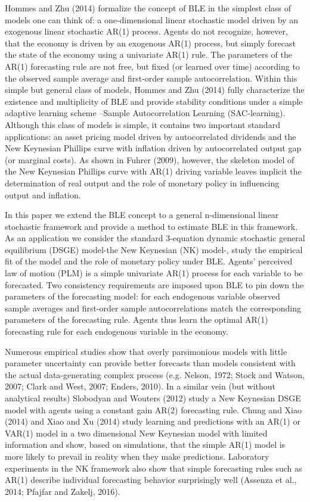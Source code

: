 Hommes and Zhu (2014) formalize the concept of BLE in the simplest class of models one can think of: a one-dimensional linear stochastic model driven by an exogenous linear stochastic AR(1) process. Agents do not recognize, however, that the economy is driven by an exogenous AR(1) process, but simply forecast the state of the economy using a
univariate AR(1) rule. The parameters of the AR(1) forecasting rule are not free, but fixed (or learned over time) according to the observed sample average and first-order sample autocorrelation. Within this simple but general class of models, Hommes and Zhu (2014) fully characterize the existence and multiplicity of BLE and provide stability conditions under a simple adaptive learning scheme --Sample Autocorrelation Learning (SAC-learning). Although this class of models is simple, it contains two important standard applications: an asset pricing model driven by autocorrelated dividends and the New Keynesian Phillips curve with inflation driven by autocorrelated output gap (or marginal costs). As shown in Fuhrer (2009), however, the skeleton model of the New Keynesian Phillips curve with AR(1) driving variable leaves implicit the determination of real output and the role of monetary policy in influencing output and inflation.

In this paper we extend the BLE concept to a general n-dimensional linear stochastic framework and provide a method to estimate BLE in this framework. As an application we consider the standard 3-equation dynamic stochastic general equilibrium (DSGE) model-the New Keynesian (NK) model-, study the empirical fit of the model and the role of monetary policy under BLE. Agents' perceived law of motion (PLM) is a simple univariate AR(1) process for each variable to be forecasted. Two consistency requirements are imposed upon BLE to pin down the parameters of the forecasting model: for each endogenous variable observed sample averages and first-order sample autocorrelations match the corresponding parameters of the forecasting rule. Agents thus learn the optimal AR(1) forecasting rule for each endogenous variable in the economy.

Numerous empirical studies show that overly parsimonious models with little parameter uncertainty can provide better forecasts than models consistent with the actual data-generating complex process (e.g. Nelson, 1972; Stock and Watson, 2007; Clark and West, 2007; Enders, 2010). In a similar vein (but without analytical results) Slobodyan and Wouters (2012) study a New Keynesian DSGE model with agents using a constant gain AR(2) forecasting rule. Chung and Xiao (2014) and Xiao and Xu (2014) study learning and predictions with an AR(1) or VAR(1) model in a two dimensional New Keynesian model with limited information and show, based on simulations, that the simple AR(1) model is more likely to prevail in reality when they make predictions. Laboratory experiments in the NK framework also show that simple forecasting rules such as AR(1) describe individual forecasting behavior surprisingly well (Assenza et al., 2014; Pfajfar and Zakelj, 2016).

